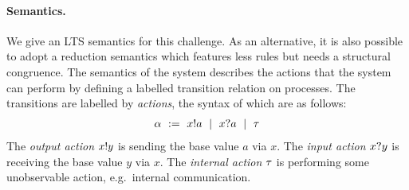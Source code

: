 



\paragraph{Semantics.} We give an LTS semantics for this challenge. As
an alternative, it is also possible to adopt a reduction semantics
which features less rules but needs a structural congruence. The
semantics of the system describes the actions that the system can
perform by defining a labelled transition relation on processes.  The
transitions are labelled by \emph{actions}, the syntax of which are as
follows:
\begin{align*}
  \alpha\ :=\  x ! a \ \mid\ x ? a \ \mid\ \tau
\end{align*}
The \emph{output action} \( x ! y \) is sending the base value
\( a \) via \( x \).  The \emph{input action} \( x ? y \) is
receiving the base value \( y \) via \( x \).  The \emph{internal
  action} \( \tau \) is performing some unobservable action, e.g.\
internal communication.

